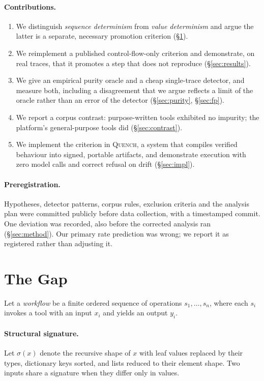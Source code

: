 \documentclass[10pt,conference]{article}
\newcommand{\quench}{\textsc{Quench}}
\begin{document}
\paragraph{Contributions.}
\begin{enumerate}
\itemsep2pt
\item We distinguish \emph{sequence determinism} from \emph{value determinism}
      and argue the latter is a separate, necessary promotion criterion
      (\S\ref{sec:gap}).
\item We reimplement a published control-flow-only criterion and demonstrate,
      on real traces, that it promotes a step that does not reproduce
      (\S\ref{sec:results}).
\item We give an empirical purity oracle and a cheap single-trace detector,
      and measure both, including a disagreement that we argue reflects a limit
      of the oracle rather than an error of the detector (\S\ref{sec:purity},
      \S\ref{sec:fp}).
\item We report a corpus contrast: purpose-written tools exhibited no impurity;
      the platform's general-purpose tools did (\S\ref{sec:contrast}).
\item We implement the criterion in \quench{}, a system that compiles verified
      behaviour into signed, portable artifacts, and demonstrate execution with
      zero model calls and correct refusal on drift (\S\ref{sec:impl}).
\end{enumerate}

\paragraph{Preregistration.} Hypotheses, detector patterns, corpus rules,
exclusion criteria and the analysis plan were committed publicly before data
collection, with a timestamped commit. One deviation was recorded, also before
the corrected analysis ran (\S\ref{sec:method}). Our primary rate prediction was
wrong; we report it as registered rather than adjusting it.

\section{The Gap}
\label{sec:gap}

Let a \emph{workflow} be a finite ordered sequence of operations
$s_1, \dots, s_n$, where each $s_i$ invokes a tool with an input $x_i$ and
yields an output $y_i$.

\paragraph{Structural signature.} Let $\sigma(x)$ denote the recursive shape of
$x$ with leaf values replaced by their types, dictionary keys sorted, and lists
reduced to their element shape. Two inputs share a signature when they differ
only in values.
\end{document}
